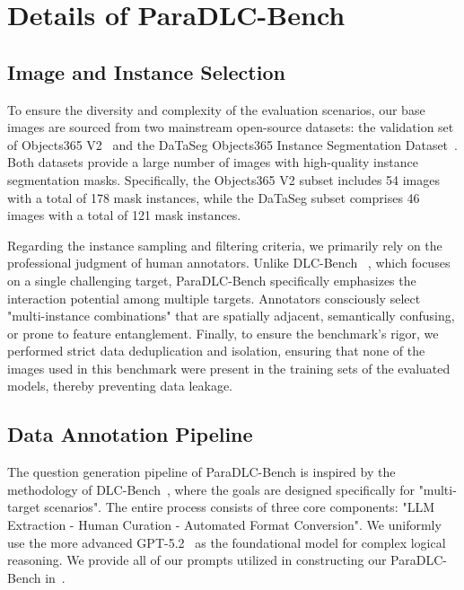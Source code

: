 \documentclass{llmxive}
\begin{document}
\section{Details of ParaDLC-Bench} \label{sec:detail_bench}
\subsection{Image and Instance Selection}
To ensure the diversity and complexity of the evaluation scenarios, our base images are sourced from two mainstream open-source datasets: the validation set of Objects365 V2~\citep{shao2019objects365} and the DaTaSeg Objects365 Instance Segmentation Dataset~\citep{gu2023dataseg}. Both datasets provide a large number of images with high-quality instance segmentation masks. Specifically, the Objects365 V2 subset includes 54 images with a total of 178 mask instances, while the DaTaSeg subset comprises 46 images with a total of 121 mask instances.

Regarding the instance sampling and filtering criteria, we primarily rely on the professional judgment of human annotators. Unlike DLC-Bench ~\citep{lian2025describe}, which focuses on a single challenging target, ParaDLC-Bench specifically emphasizes the interaction potential among multiple targets. Annotators consciously select "multi-instance combinations" that are spatially adjacent, semantically confusing, or prone to feature entanglement. Finally, to ensure the benchmark's rigor, we performed strict data deduplication and isolation, ensuring that none of the images used in this benchmark were present in the training sets of the evaluated models, thereby preventing data leakage.

\subsection{Data Annotation Pipeline}
The question generation pipeline of ParaDLC-Bench is inspired by the methodology of DLC-Bench~\citep{lian2025describe}, where the goals are designed specifically for "multi-target scenarios". The entire process consists of three core components: "LLM Extraction - Human Curation - Automated Format Conversion". 
%
We uniformly use the more advanced GPT-5.2~\citep{gpt5.2} as the foundational model for complex logical reasoning. 
%
We provide all of our prompts utilized in constructing our ParaDLC-Bench in~.
\end{document}
